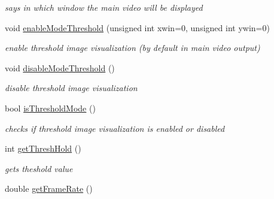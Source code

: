 \begin{DoxyCompactItemize}
\begin{DoxyCompactList}\small\item\em says in which window the main video will be displayed \end{DoxyCompactList}\item 
\hypertarget{classavr_application_a8be1c8718562df698a25ec7474e861fa}{void \hyperlink{classavr_application_a8be1c8718562df698a25ec7474e861fa}{enable\-Mode\-Threshold} (unsigned int xwin=0, unsigned int ywin=0)}\label{classavr_application_a8be1c8718562df698a25ec7474e861fa}

\begin{DoxyCompactList}\small\item\em enable threshold image visualization (by default in main video output) \end{DoxyCompactList}\item 
\hypertarget{classavr_application_ad2097ba1b941d67a1225d8cb9201239c}{void \hyperlink{classavr_application_ad2097ba1b941d67a1225d8cb9201239c}{disable\-Mode\-Threshold} ()}\label{classavr_application_ad2097ba1b941d67a1225d8cb9201239c}

\begin{DoxyCompactList}\small\item\em disable threshold image visualization \end{DoxyCompactList}\item 
\hypertarget{classavr_application_a4775aac0f1c623a5a54d6a24518ab2bc}{bool \hyperlink{classavr_application_a4775aac0f1c623a5a54d6a24518ab2bc}{is\-Threshold\-Mode} ()}\label{classavr_application_a4775aac0f1c623a5a54d6a24518ab2bc}

\begin{DoxyCompactList}\small\item\em checks if threshold image visualization is enabled or disabled \end{DoxyCompactList}\item 
\hypertarget{classavr_application_abb48275b9f81a7acbe6a64caa143905b}{int \hyperlink{classavr_application_abb48275b9f81a7acbe6a64caa143905b}{get\-Thresh\-Hold} ()}\label{classavr_application_abb48275b9f81a7acbe6a64caa143905b}

\begin{DoxyCompactList}\small\item\em gets theshold value \end{DoxyCompactList}\item 
\hypertarget{classavr_application_a7f8fbffc3401662d4a9505396240203f}{double \hyperlink{classavr_application_a7f8fbffc3401662d4a9505396240203f}{get\-Frame\-Rate} ()}\label{classavr_application_a7f8fbffc3401662d4a9505396240203f}


\end{DoxyCompactItemize}
